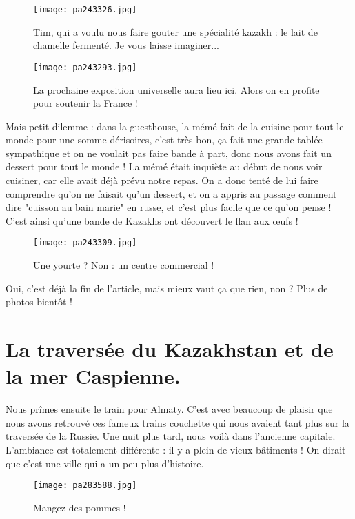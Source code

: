 \documentclass{book}
\begin{document}
\begin{figure}[h]
\centering
\texttt{[image: pa243326.jpg]}
\caption*{Tim, qui a voulu nous faire gouter une spécialité kazakh : le lait de chamelle fermenté. Je vous laisse imaginer...}
\end{figure}


\begin{figure}[h]
\centering
\texttt{[image: pa243293.jpg]}
\caption*{La prochaine exposition universelle aura lieu ici. Alors on en profite pour soutenir la France !}
\end{figure}

Mais petit dilemme : dans la guesthouse, la mémé fait de la cuisine pour tout le monde pour une somme dérisoires, c'est très bon, ça fait une grande tablée sympathique et on ne voulait pas faire bande à part, donc nous avons fait un dessert pour tout le monde ! La mémé était inquiète au début de nous voir cuisiner, car elle avait déjà prévu notre repas. On a donc tenté de lui faire comprendre qu'on ne faisait qu'un dessert, et on a appris au passage comment dire "cuisson au bain marie" en russe, et c'est plus facile que ce qu'on pense ! C'est ainsi qu'une bande de Kazakhs ont découvert le flan aux œufs !


\begin{figure}[h]
\centering
\texttt{[image: pa243309.jpg]}
\caption*{Une yourte ? Non : un centre commercial !}
\end{figure}

Oui, c'est déjà la fin de l'article, mais mieux vaut ça que rien, non ? Plus de photos bientôt !

\chapter{La traversée du Kazakhstan et de la mer Caspienne.}
Nous prîmes ensuite le train pour Almaty. C'est avec beaucoup de plaisir que nous avons retrouvé ces fameux trains couchette qui nous avaient tant plus sur la traversée de la Russie. Une nuit plus tard, nous voilà dans l'ancienne capitale. L'ambiance est totalement différente : il y a plein de vieux bâtiments ! On dirait que c'est une ville qui a un peu plus d'histoire.


\begin{figure}[h]
\centering
\texttt{[image: pa283588.jpg]}
\caption*{Mangez des pommes !}
\end{figure}
\end{document}
